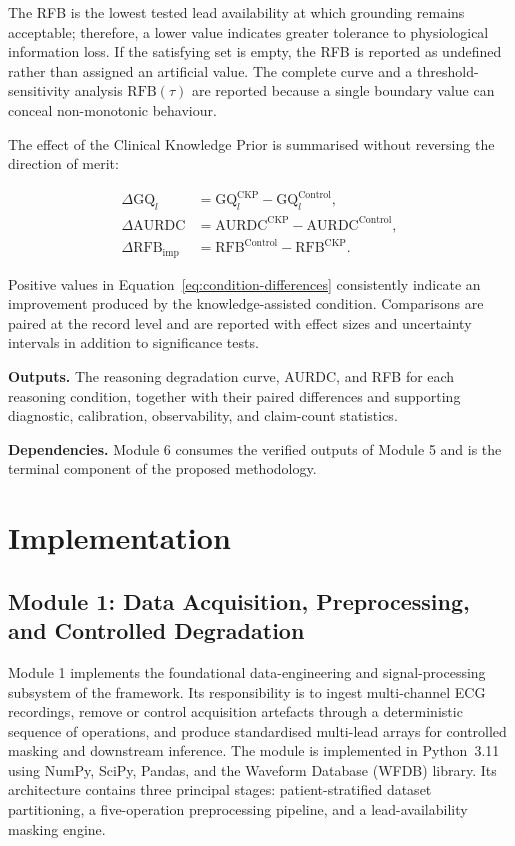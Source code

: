 \documentclass{ssnreview}
\begin{document}
The RFB is the lowest tested lead availability at which grounding remains acceptable;
therefore, a lower value indicates greater tolerance to physiological information loss. If
the satisfying set is empty, the RFB is reported as undefined rather than assigned an
artificial value. The complete curve and a threshold-sensitivity analysis
$\mathrm{RFB}(\tau)$ are reported because a single boundary value can conceal
non-monotonic behaviour.

The effect of the Clinical Knowledge Prior is summarised without reversing the direction
of merit:

\begin{align}
  \Delta\mathrm{GQ}_l
  &=\mathrm{GQ}^{\mathrm{CKP}}_l-\mathrm{GQ}^{\mathrm{Control}}_l,
  \nonumber\\
  \Delta\mathrm{AURDC}
  &=\mathrm{AURDC}^{\mathrm{CKP}}
  -\mathrm{AURDC}^{\mathrm{Control}},
  \nonumber\\
  \Delta\mathrm{RFB}_{\mathrm{imp}}
  &=\mathrm{RFB}^{\mathrm{Control}}-\mathrm{RFB}^{\mathrm{CKP}}.
  \label{eq:condition-differences}
\end{align}

Positive values in Equation~\ref{eq:condition-differences} consistently indicate an
improvement produced by the knowledge-assisted condition. Comparisons are paired at the
record level and are reported with effect sizes and uncertainty intervals in addition to
significance tests.

\textbf{Outputs.} The reasoning degradation curve, AURDC, and RFB for each reasoning
condition, together with their paired differences and supporting diagnostic, calibration,
observability, and claim-count statistics.

\textbf{Dependencies.} Module 6 consumes the verified outputs of Module 5 and is the
terminal component of the proposed methodology.

\chapter{Implementation}

\section{Module 1: Data Acquisition, Preprocessing, and Controlled Degradation}

Module 1 implements the foundational data-engineering and signal-processing subsystem of
the framework. Its responsibility is to ingest multi-channel ECG recordings, remove or
control acquisition artefacts through a deterministic sequence of operations, and produce
standardised multi-lead arrays for controlled masking and downstream inference. The module
is implemented in Python~3.11 using NumPy, SciPy, Pandas, and the Waveform Database
(WFDB) library. Its architecture contains three principal stages: patient-stratified dataset
partitioning, a five-operation preprocessing pipeline, and a lead-availability masking
engine.
\end{document}
